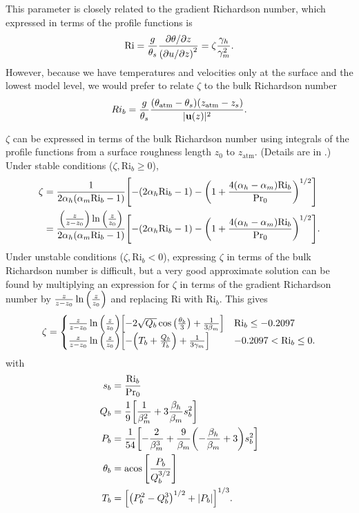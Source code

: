 \documentclass[10pt]{article}
\begin{document}
This parameter is closely related to the gradient Richardson number, which expressed in terms of the profile functions is
\begin{equation*}
\mathrm{Ri} = \frac{g}{\theta_s} \frac{\partial \theta / \partial z}{\qty(\partial u / \partial z)^2} = \zeta \frac{\gamma_h}{\gamma_m^2}.
\end{equation*}
However, because we have temperatures and velocities only at the surface and the lowest model level, we would prefer to relate $\zeta$ to the bulk Richardson number
\begin{equation} \label{eqn:Ri_b}
Ri_b = \frac{g}{\theta_s}\frac{(\theta_{\mathrm{atm}} - \theta_s)(z_{\mathrm{atm}} - z_s)}{|{\bf u}(z)|^2}.
\end{equation}

$\zeta$ can be expressed in terms of the bulk Richardson number using integrals of the profile functions from a surface roughness length $z_0$ to $z_{\mathrm{atm}}$. (Details are in \citet{Byun1990}.) Under stable conditions ($\zeta, \mathrm{Ri}_b \ge 0$),
\begin{align} 
\zeta &= \frac{1}{2 \alpha_h (\alpha_m \mathrm{Ri}_b - 1)} \qty[ -(2 \alpha_h \mathrm{Ri}_b - 1) - \qty(1 + \frac{4(\alpha_h - \alpha_m) \mathrm{Ri}_b}{\mathrm{Pr}_0})^{1/2} ] \\
&= \label{eqn:zeta1} \frac{\qty(\frac{z}{z - z_0}) \ln \qty(\frac{z}{z_0})}{2 \alpha_h (\alpha_m \mathrm{Ri}_b - 1)} \qty[ -(2 \alpha_h \mathrm{Ri}_b - 1) - \qty(1 + \frac{4(\alpha_h - \alpha_m) \mathrm{Ri}_b}{\mathrm{Pr}_0})^{1/2} ].
\end{align}
Under unstable conditions ($\zeta, \mathrm{Ri}_b < 0$), expressing $\zeta$ in terms of the bulk Richardson number is difficult, but a very good approximate solution can be found by multiplying an expression for $\zeta$ in terms of the gradient Richardson number by $\frac{z}{z - z_0} \ln \qty(\frac{z}{z_0})$ and replacing $\mathrm{Ri}$ with $\mathrm{Ri}_b$. This gives
\begin{equation} \label{eqn:zeta2}
\zeta = 
\begin{cases}
\frac{z}{z - z_0} \ln \qty(\frac{z}{z_0}) \qty [ -2 \sqrt{Q_b} \cos \qty(\frac{\theta_b}{3}) + \frac{1}{3 \beta_m}] & \mathrm{Ri}_b \le -0.2097 \\
\frac{z}{z - z_0} \ln \qty(\frac{z}{z_0}) \qty [-\qty(T_b + \frac{Q_b}{T_b}) + \frac{1}{3 \gamma_m}] & -0.2097 < \mathrm{Ri}_b \le 0.
\end{cases}
\end{equation}
with
\begin{align*}
s_b &= \frac{\mathrm{Ri}_b}{\mathrm{Pr}_0} \\
Q_b &= \frac{1}{9} \qty [\frac{1}{\beta_m^2} + 3 \frac{\beta_h}{\beta_m} s_b^2] \\
P_b &= \frac{1}{54} \qty [-\frac{2}{\beta_m^3} + \frac{9}{\beta_m} \qty(-\frac{\beta_h}{\beta_m} + 3) s_b^2] \\
\theta_b &= \acos \qty [\frac{P_b}{Q_b^{3/2}}] \\
T_b &= \qty [ \qty(P_b^2 - Q_b^3)^{1/2} + |P_b|]^{1/3}.
\end{align*}
\end{document}
